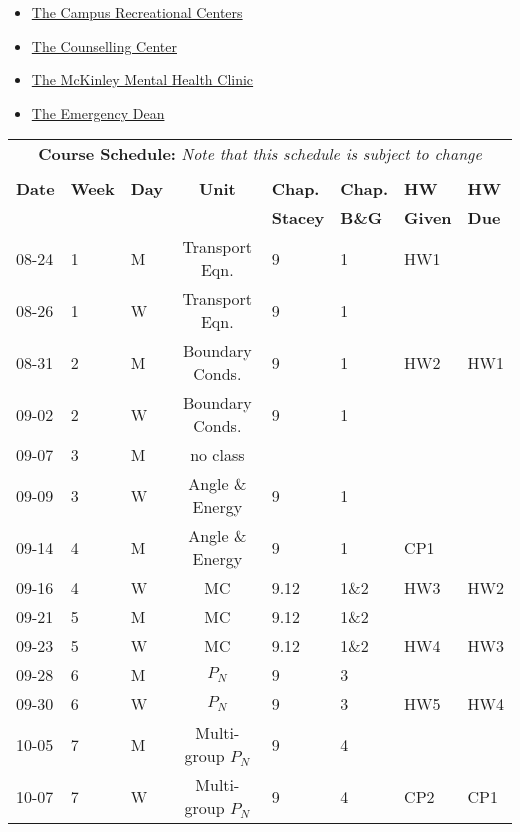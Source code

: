 \documentclass[11pt, a4paper]{article}
\begin{document}
\begin{itemize}
\item \href{https://campusrec.illinois.edu/}{The Campus Recreational Centers}
\item \href{http://counselingcenter.illinois.edu/}{The Counselling Center}
\item \href{http://www.mckinley.illinois.edu/clinics/mental\_health.htm}{The McKinley Mental Health Clinic}
\item \href{http://odos.illinois.edu/emergency/}{The Emergency Dean}
\end{itemize}

\pagebreak
\FloatBarrier
\renewcommand{\arraystretch}{1}
\begin{table}[h]
\begin{center}
\begin{tabular}{lllcllll}
\multicolumn{8}{c}{\textbf{Course Schedule:}\textit{ Note that this schedule is subject to change}}\\
&&&&&&&\\
\textbf{Date} & \textbf{Week} & \textbf{Day} & \textbf{Unit} & \textbf{Chap.} & \textbf{Chap.} & \textbf{HW} & \textbf{HW}\\
              &  &  & & \textbf{Stacey}& \textbf{B\&G} & \textbf{Given} & \textbf{Due}\\
\hline
\hline
08-24 & 1 & M & Transport Eqn. & 9 & 1 & HW1 & \\
08-26 & 1 & W & Transport Eqn. & 9 & 1 &  & \\
08-31 & 2 & M & Boundary Conds. & 9 & 1 & HW2 & HW1\\
09-02 & 2 & W & Boundary Conds. & 9 & 1 &  & \\
09-07 & 3 & M & no class &  &  &  & \\
09-09 & 3 & W & Angle \& Energy & 9 & 1 &  & \\
09-14 & 4 & M & Angle \& Energy & 9 & 1 & CP1 & \\
09-16 & 4 & W & MC    & 9.12 & 1\&2 &  HW3 & HW2\\
09-21 & 5 & M & MC & 9.12 & 1\&2 &  & \\
09-23 & 5 & W & MC & 9.12 & 1\&2 & HW4 & HW3\\
09-28 & 6 & M & $P_N$ & 9 & 3 &  & \\
09-30 & 6 & W & $P_N$ & 9 & 3 & HW5 & HW4 \\
10-05 & 7 & M & Multi-group $P_N$ & 9 & 4 &  & \\
10-07 & 7 & W & Multi-group $P_N$ & 9 & 4 & CP2 & CP1\\

\end{tabular}
\end{center}
\end{table}
\end{document}
